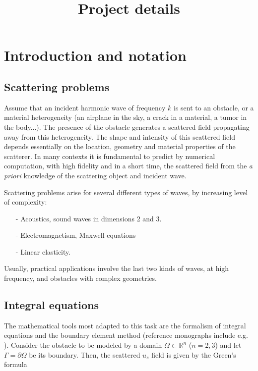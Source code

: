 \documentclass[]{article}
\title{Project details}
\date{}
\author{}
\begin{document}
\maketitle

\section{Introduction and notation}


\subsection*{Scattering problems}

Assume that an incident harmonic wave of frequency $k$ is sent to an obstacle, or a material heterogeneity (an airplane in the sky, a crack in a material, a tumor in the body...). The presence of the obstacle generates a scattered field propagating away from this heterogeneity. The shape and intensity of this scattered field depends essentially on the location, geometry and material properties of the scatterer. In many contexts it is fundamental to predict by numerical computation, with high fidelity and in a short time, the scattered field from the \textit{a priori} knowledge of the scattering object and incident wave. 

Scattering problems arise for several different types of waves, by increasing level of complexity:
\begin{itemize}
	\item[-] Acoustics, sound waves in dimensions 2 and 3.
	\item[-] Electromagnetism, Maxwell equations
	\item[-] Linear elasticity. 
\end{itemize} 
Usually, practical applications involve the last two kinds of waves, at high frequency, and obstacles with complex geometries.  

\subsection*{Integral equations}

The mathematical tools most adapted to this task are the formalism of integral equations and the boundary element method (reference monographs include e.g. \cite{mclean2000strongly,sauter2010boundary}). Consider the obstacle to be modeled by a domain $\Omega \subset \mathbb{R}^n$ ($n=2,3$) and let $\Gamma = \partial \Omega$ be its boundary. Then, the scattered $u_s$ field is given by the Green's formula
\end{document}
